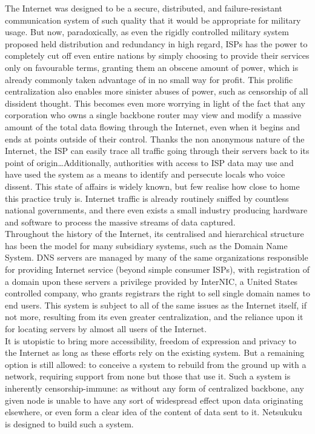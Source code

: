\documentclass[a4paper]{article}
\begin{document}
The Internet was designed to be a secure, distributed, and failure-resistant
communication system of such quality that it would be appropriate for military
usage. But now, paradoxically, as even the rigidly controlled military system
proposed held distribution and redundancy in high regard, ISPs has the power
to completely cut off even entire nations by simply choosing to provide
their services only on favourable terms\cite{digitaldivide}, granting
them an obscene amount of power, which is already commonly taken
advantage of in no small way for profit. This prolific centralization
also enables more sinister abuses of power, such as censorship of all
dissident thought\cite{cbschina}.
This becomes even more worrying in light of the fact that any corporation who
owns a single backbone router may view and modify a massive amount of the
total data flowing through the Internet, even when it begins and ends at 
points outside of their control. Thanks the non anonymous nature of the 
Internet, the ISP can easily trace all traffic going through their servers
back to its point of origin\dots Additionally, authorities with access 
to ISP data may use and have used the system as a means to identify and 
persecute locals who voice dissent\cite{ipdindymedia}.
This state of affairs is widely known, but few realise how close to home
this practice truly is. Internet traffic is already routinely sniffed by
countless national governments, and there even exists a small industry
producing hardware and software to process the massive streams of data
captured.\\

Throughout the history of the Internet, its centralised and hierarchical 
structure has been the model for many subsidiary systems, such as the
Domain Name System. DNS servers are managed by many of the same organizations
responsible for providing Internet service (beyond simple consumer ISPs), with 
registration of a domain upon these servers a privilege provided by InterNIC, 
a United States controlled company, who grants registrars the right to sell 
single domain names to end users.  This system is subject to all of the same 
issues as the Internet itself, if not more, resulting from its even greater
centralization, and the reliance upon it for locating servers by almost all
users of the Internet.\\

It is utopistic to bring more accessibility, freedom of expression and
privacy to the Internet as long as these efforts rely on the existing
system. But a remaining option is still allowed: to conceive a system to
rebuild from the ground up with a network, requiring support from none
but those that use it. Such a system is inherently censorship-immune:
as without any form of centralized backbone,  any given node is unable
to have any sort of widespread effect upon data originating elsewhere,
or even form a clear idea of the content of data sent to it. Netsukuku
is designed to build such a system.
\end{document}
